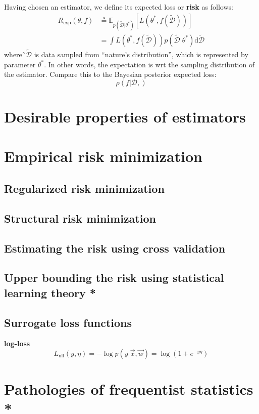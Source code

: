 Having chosen an estimator, we define its expected loss or \textbf{risk} as follows:
\begin{equation}\begin{split}
R_{\mathrm{exp}}(\theta,f) & \triangleq \mathbb{E}_{p(\tilde{\mathcal{D}}|\theta^*)}[L(\theta^*, f(\tilde{\mathcal{D}}))] \\
    & =\int L(\theta^*, f(\tilde{\mathcal{D}}))p(\tilde{\mathcal{D}}|\theta^*)\mathrm{d}\tilde{\mathcal{D}}
\end{split}\end{equation}
where˜$\tilde{\mathcal{D}}$ is data sampled from “nature’s distribution”, which is represented by parameter $\theta^*$. In other words, the expectation is wrt the sampling distribution of the estimator. Compare this to the Bayesian posterior expected loss:
\begin{equation}
\rho(f|\mathcal{D},)
\end{equation}


\section{Desirable properties of estimators}


\section{Empirical risk minimization}


\subsection{Regularized risk minimization}


\subsection{Structural risk minimization}


\subsection{Estimating the risk using cross validation}


\subsection{Upper bounding the risk using statistical learning theory *}


\subsection{Surrogate loss functions}
\label{sec:Surrogate-loss-functions}

\textbf{log-loss}
\begin{equation}\label{eqn:log-loss}
L_{\mathrm{nll}}(y,\eta)=-\log p(y|\vec{x},\vec{w})=\log(1+e^{-y\eta})
\end{equation}


\section{Pathologies of frequentist statistics *}

